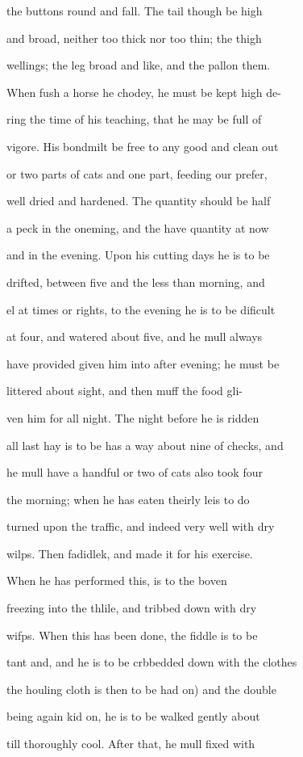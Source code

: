\documentclass{article}
\begin{document}
the buttons round and fall. The tail though be high

and broad, neither too thick nor too thin; the thigh

wellings; the leg broad and like, and the pallon them.

When fush a horse he chodey, he must be kept high de-

ring the time of his teaching, that he may be full of

vigore. His bondmilt be free to any good and clean out

or two parts of cats and one part, feeding our prefer,

well dried and hardened. The quantity should be half

a peck in the oneming, and the have quantity at now

and in the evening. Upon his cutting days he is to be

drifted, between five and the less than morning, and

el at times or rights, to the evening he is to be dificult

at four, and watered about five, and he mull always

have provided given him into after evening; he must be

littered about sight, and then muff the food gli-

ven him for all night. The night before he is ridden

all last hay is to be has a way about nine of checks, and

he mull have a handful or two of cats also took four

the morning; when he has eaten theirly leis to do

turned upon the traffic, and indeed very well with dry

wilps. Then fadidlek, and made it for his exercise.

When he has performed this, is to the boven

freezing into the thlile, and tribbed down with dry

wifps. When this has been done, the fiddle is to be

tant and, and he is to be crbbedded down with the clothes

the houling cloth is then to be had on) and the double

being again kid on, he is to be walked gently about

till thoroughly cool. After that, he mull fixed with
\end{document}
